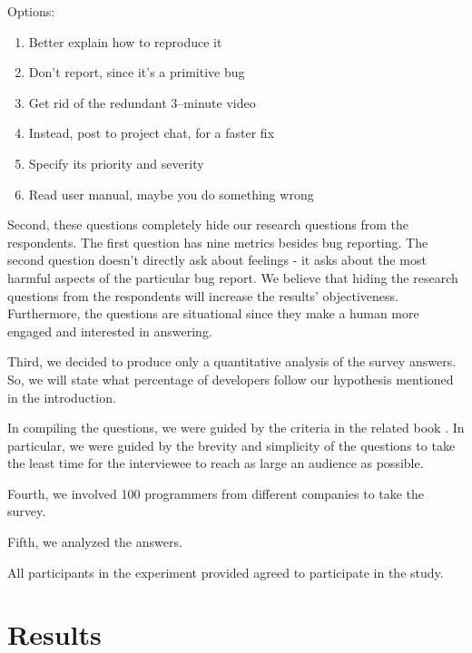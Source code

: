 \documentclass[11pt,review,sigplan,nonacm,natbib=false]{acmart}
\begin{document}
Options:
\begin{enumerate}
    \item Better explain how to reproduce it
    \item Don't report, since it's a primitive bug
    \item Get rid of the redundant 3--minute video
    \item Instead, post to project chat, for a faster fix
    \item Specify its priority and severity
    \item Read user manual, maybe you do something wrong
\end{enumerate}

Second, these questions completely hide our research questions from the respondents. The first question has nine metrics besides bug reporting. The second question doesn't directly ask about feelings - it asks about the most harmful aspects of the particular bug report. We believe that hiding the research questions from the respondents will increase the results' objectiveness. Furthermore, the questions are situational since they make a human more engaged and interested in answering.

Third, we decided to produce only a quantitative analysis of the survey answers. So, we will state what percentage of developers follow our hypothesis mentioned in the introduction.

In compiling the questions, we were guided by the criteria in the related book \cite{QuestionnaireBook}. In particular, we were guided by the brevity and simplicity of the questions to take the least time for the interviewee to reach as large an audience as possible. 

Fourth, we involved 100 programmers from different companies to take the survey.

Fifth, we analyzed the answers.

All participants in the experiment provided agreed to participate in the study.

\section{Results}



\end{document}
